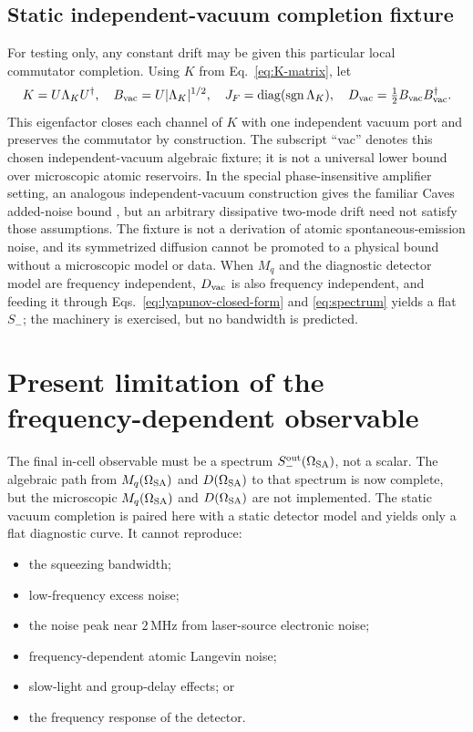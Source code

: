 \documentclass[11pt,a4paper]{article}
\newcommand{\MHz}{\,\mathrm{MHz}}
\begin{document}
\subsection{Static independent-vacuum completion fixture}

For testing only, any constant drift may be given this particular local
commutator completion. Using $K$ from Eq.~\eqref{eq:K-matrix}, let
\begin{equation}
K=U\Lambda_KU^\dagger,\quad
B_{\rm vac}=U|\Lambda_K|^{1/2},\quad
J_F=\operatorname{diag}(\operatorname{sgn}\Lambda_K),\quad
D_{\rm vac}=\tfrac12B_{\rm vac}B_{\rm vac}^\dagger .
\label{eq:minimal-dilation}
\end{equation}
This eigenfactor closes each channel of $K$ with one independent vacuum port
and preserves the commutator by construction. The subscript ``vac'' denotes
this chosen independent-vacuum algebraic fixture; it is not a universal lower
bound over microscopic atomic reservoirs. In the special phase-insensitive amplifier
setting, an analogous independent-vacuum construction gives the familiar
Caves added-noise bound \cite{Caves1982}, but an arbitrary dissipative
two-mode drift need not satisfy those assumptions. The fixture is not a
derivation of atomic spontaneous-emission noise, and its symmetrized diffusion
cannot be promoted to a physical bound without a microscopic model or data. When
$M_q$ and the diagnostic detector model are frequency independent,
$D_{\rm vac}$ is also frequency independent, and feeding it through
Eqs.~\eqref{eq:lyapunov-closed-form} and \eqref{eq:spectrum} yields a flat
$S_-$; the machinery is exercised, but no bandwidth is predicted.

\section{Present limitation of the frequency-dependent observable}

The final in-cell observable must be a spectrum
$S_-^{\rm out}(\Omega_{\rm SA})$, not a scalar. The algebraic path from
$M_q(\Omega_{\rm SA})$ and $D(\Omega_{\rm SA})$ to that spectrum is now
complete, but the microscopic $M_q(\Omega_{\rm SA})$ and
$D(\Omega_{\rm SA})$ are not implemented. The static vacuum completion is
paired here with a static detector model and yields only a flat diagnostic
curve. It cannot reproduce:
\begin{itemize}
\item the squeezing bandwidth;
\item low-frequency excess noise;
\item the noise peak near $2\MHz$ from laser-source electronic noise;
\item frequency-dependent atomic Langevin noise;
\item slow-light and group-delay effects; or
\item the frequency response of the detector.
\end{itemize}
\end{document}
